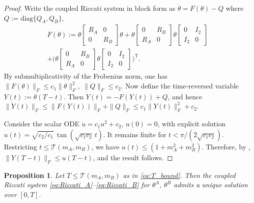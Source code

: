 \documentclass[letterpaper, 10 pt, conference]{ieeeconf}
\newcommand{\diag}{\mathrm{diag}}
\newcommand{\transpose}{^\mathsf{T}}
\newtheorem{proposition}{Proposition}
\begin{document}
\begin{proof}
Write the coupled Riccati system in block form as
$\dot{\theta} = F(\theta) - Q$ where $Q := \diag\{Q_A, Q_B\}$, 
    \begin{multline*}
        F(\theta) := \theta \begin{bmatrix} R_A & 0 \\ 0 & R_B \end{bmatrix} \theta + \theta \begin{bmatrix} 0 & R_B \\ R_A & 0 \end{bmatrix}\theta \begin{bmatrix} 0 & I_2 \\ I_2 & 0 \end{bmatrix} \\
        + \Big(\theta \begin{bmatrix} 0 & R_B \\ R_A & 0 \end{bmatrix}\theta \begin{bmatrix} 0 & I_2 \\ I_2 & 0 \end{bmatrix}\Big)\transpose. 
    \end{multline*}
    By submultiplicativity of the Frobenius norm, one has $\|F(\theta)\|_F \le c_1 \|\theta\|_F^2, \; \|Q\|_F \le c_2$. 
    Now define the time-reversed variable \(Y(t):=\theta(T-t)\). Then $
\dot{Y}(t) = -F(Y(t))+Q$,
and hence
$
\|\dot{Y}(t)\|_F
\le \|F(Y(t))\|_F+\|Q\|_F
\le c_1\|Y(t)\|_F^2+c_2$.

Consider the scalar ODE $\dot{u} = c_1 u^2 + c_2$, $u(0) = 0$, with explicit solution $u(t) = \sqrt{c_2/c_1}\,\tan(\sqrt{c_1 c_2}\, t)$. It remains finite for $t < \pi/(2\sqrt{c_1 c_2})$.  Restricting $t \leq \mathcal{T}(m_A, m_B)$, we have $u(t) \leq (1 + m_A^2 + m_B^2)$. Therefore, by  \cite[Corollary~6.3]{hale2009ordinary}, $\|Y(T-t)\|_F \leq u(T-t)$, and the result follows.  
\end{proof}


\begin{proposition}\label{prop:exist_unique_baseline}
    Let $T \leq \mathcal{T}(m_A, m_B)$ as in \eqref{eq:T_bound}.  Then the coupled Riccati system \eqref{eq:Riccati_A}--\eqref{eq:Riccati_B} for $\theta^A$, $\theta^B$ %
    admits a unique solution over $[0,T]$.
\end{proposition}
\end{document}

